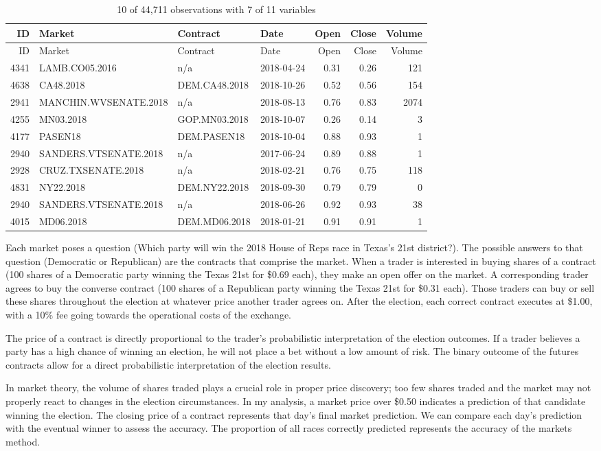 \documentclass[]{article}
\begin{document}
\begin{longtable}[]{@{}rlllrrr@{}}
\caption{10 of 44,711 observations with 7 of 11
variables}\tabularnewline
\toprule
ID & Market & Contract & Date & Open & Close & Volume\tabularnewline
\midrule
\endfirsthead
\toprule
ID & Market & Contract & Date & Open & Close & Volume\tabularnewline
\midrule
\endhead
4341 & LAMB.CO05.2016 & n/a & 2018-04-24 & 0.31 & 0.26 &
121\tabularnewline
4638 & CA48.2018 & DEM.CA48.2018 & 2018-10-26 & 0.52 & 0.56 &
154\tabularnewline
2941 & MANCHIN.WVSENATE.2018 & n/a & 2018-08-13 & 0.76 & 0.83 &
2074\tabularnewline
4255 & MN03.2018 & GOP.MN03.2018 & 2018-10-07 & 0.26 & 0.14 &
3\tabularnewline
4177 & PASEN18 & DEM.PASEN18 & 2018-10-04 & 0.88 & 0.93 &
1\tabularnewline
2940 & SANDERS.VTSENATE.2018 & n/a & 2017-06-24 & 0.89 & 0.88 &
1\tabularnewline
2928 & CRUZ.TXSENATE.2018 & n/a & 2018-02-21 & 0.76 & 0.75 &
118\tabularnewline
4831 & NY22.2018 & DEM.NY22.2018 & 2018-09-30 & 0.79 & 0.79 &
0\tabularnewline
2940 & SANDERS.VTSENATE.2018 & n/a & 2018-06-26 & 0.92 & 0.93 &
38\tabularnewline
4015 & MD06.2018 & DEM.MD06.2018 & 2018-01-21 & 0.91 & 0.91 &
1\tabularnewline
\bottomrule
\end{longtable}

Each market poses a question (Which party will win the 2018 House of
Reps race in Texas's 21st district?). The possible answers to that
question (Democratic or Republican) are the contracts that comprise the
market. When a trader is interested in buying shares of a contract (100
shares of a Democratic party winning the Texas 21st for \$0.69 each),
they make an open offer on the market. A corresponding trader agrees to
buy the converse contract (100 shares of a Republican party winning the
Texas 21st for \$0.31 each). Those traders can buy or sell these shares
throughout the election at whatever price another trader agrees on.
After the election, each correct contract executes at \$1.00, with a
10\% fee going towards the operational costs of the exchange.

The price of a contract is directly proportional to the trader's
probabilistic interpretation of the election outcomes. If a trader
believes a party has a high chance of winning an election, he will not
place a bet without a low amount of risk. The binary outcome of the
futures contracts allow for a direct probabilistic interpretation of the
election results.

In market theory, the volume of shares traded plays a crucial role in
proper price discovery; too few shares traded and the market may not
properly react to changes in the election circumstances. In my analysis,
a market price over \$0.50 indicates a prediction of that candidate
winning the election. The closing price of a contract represents that
day's final market prediction. We can compare each day's prediction with
the eventual winner to assess the accuracy. The proportion of all races
correctly predicted represents the accuracy of the markets method.
\end{document}
